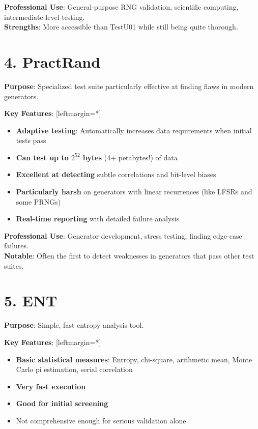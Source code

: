 \documentclass[12pt]{article}
\begin{document}
\textbf{Professional Use}: General-purpose RNG validation, scientific computing, intermediate-level testing. \\
\textbf{Strengths}: More accessible than TestU01 while still being quite thorough.

\section*{4. PractRand}

\textbf{Purpose}: Specialized test suite particularly effective at finding flaws in modern generators.

\textbf{Key Features}:
[leftmargin=*]
\begin{itemize}
    \item \textbf{Adaptive testing}: Automatically increases data requirements when initial tests pass
    \item \textbf{Can test up to $2^{52}$ bytes} (4+ petabytes!) of data
    \item \textbf{Excellent at detecting} subtle correlations and bit-level biases
    \item \textbf{Particularly harsh} on generators with linear recurrences (like LFSRs and some PRNGs)
    \item \textbf{Real-time reporting} with detailed failure analysis

\end{itemize}
\textbf{Professional Use}: Generator development, stress testing, finding edge-case failures. \\
\textbf{Notable}: Often the first to detect weaknesses in generators that pass other test suites.

\section*{5. ENT}

\textbf{Purpose}: Simple, fast entropy analysis tool.

\textbf{Key Features}:
[leftmargin=*]
\begin{itemize}
    \item \textbf{Basic statistical measures}: Entropy, chi-square, arithmetic mean, Monte Carlo pi estimation, serial correlation
    \item \textbf{Very fast execution}
    \item \textbf{Good for initial screening}
    \item Not comprehensive enough for serious validation alone
\end{itemize}
\end{document}
